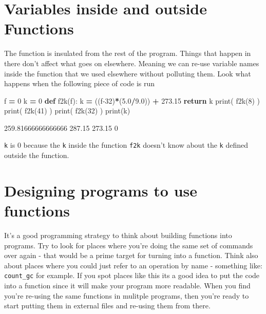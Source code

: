 \documentclass[]{book}
\newenvironment{Shaded}{\begin{snugshade}}{\end{snugshade}}
\newcommand{\BuiltInTok}[1]{#1}
\newcommand{\ControlFlowTok}[1]{\textcolor[rgb]{0.13,0.29,0.53}{\textbf{#1}}}
\newcommand{\DecValTok}[1]{\textcolor[rgb]{0.00,0.00,0.81}{#1}}
\newcommand{\FloatTok}[1]{\textcolor[rgb]{0.00,0.00,0.81}{#1}}
\newcommand{\KeywordTok}[1]{\textcolor[rgb]{0.13,0.29,0.53}{\textbf{#1}}}
\newcommand{\NormalTok}[1]{#1}
\newcommand{\OperatorTok}[1]{\textcolor[rgb]{0.81,0.36,0.00}{\textbf{#1}}}
\theoremstyle{definition}
\theoremstyle{definition}
\theoremstyle{definition}
\theoremstyle{remark}
\begin{document}
\hypertarget{variables-inside-and-outside-functions}{%
\section{Variables inside and outside
Functions}\label{variables-inside-and-outside-functions}}

The function is insulated from the rest of the program. Things that
happen in there don't affect what goes on elsewhere. Meaning we can
re-use variable names inside the function that we used elsewhere without
polluting them. Look what happens when the following piece of code is
run

\begin{Shaded}
\begin{Highlighting}[]
\NormalTok{f }\OperatorTok{=} \DecValTok{0}
\NormalTok{k }\OperatorTok{=} \DecValTok{0}
\KeywordTok{def}\NormalTok{ f2k(f):}
\NormalTok{    k }\OperatorTok{=}\NormalTok{ ((f}\DecValTok{-32}\NormalTok{)}\OperatorTok{*}\NormalTok{(}\FloatTok{5.0}\OperatorTok{/}\FloatTok{9.0}\NormalTok{)) }\OperatorTok{+} \FloatTok{273.15}
    \ControlFlowTok{return}\NormalTok{ k}
\BuiltInTok{print}\NormalTok{( f2k(}\DecValTok{8}\NormalTok{) )}
\BuiltInTok{print}\NormalTok{( f2k(}\DecValTok{41}\NormalTok{) )}
\BuiltInTok{print}\NormalTok{( f2k(}\DecValTok{32}\NormalTok{) )}
\BuiltInTok{print}\NormalTok{(k)}
\end{Highlighting}
\end{Shaded}

\begin{Shaded}
\begin{Highlighting}[]
\FloatTok{259.81666666666666}
\FloatTok{287.15}
\FloatTok{273.15}
\DecValTok{0}
\end{Highlighting}
\end{Shaded}

\texttt{k} is 0 because the \texttt{k} inside the function \texttt{f2k}
doesn't know about the \texttt{k} defined outside the function.

\hypertarget{designing-programs-to-use-functions}{%
\section{Designing programs to use
functions}\label{designing-programs-to-use-functions}}

It's a good programming strategy to think about building functions into
programs. Try to look for places where you're doing the same set of
commands over again - that would be a prime target for turning into a
function. Think also about places where you could just refer to an
operation by name - something like: \texttt{count\_gc} for example. If
you spot places like this its a good idea to put the code into a
function since it will make your program more readable. When you find
you're re-using the same functions in mulitple programs, then you're
ready to start putting them in external files and re-using them from
there.
\end{document}
